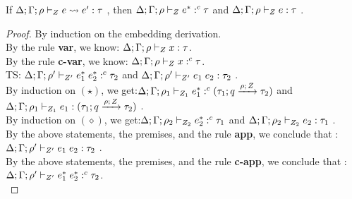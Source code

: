 \begin{thm}
If $  \Delta;  \Gamma; \rho \vdash_{ Z}  e \rightsquigarrow e'   : 
     \tau $ , then $  \Delta; \Gamma; \rho \vdash_{ Z} { e^*} :^c  \tau   $ and $   \Delta; \Gamma; \rho \vdash_{Z} e: \tau$ .
\end{thm}
\begin{proof}
By induction on the embedding derivation.\\
    By the rule \textbf{var}, we know: $   \Delta; \Gamma; \rho \vdash_{Z} x : \tau $.\\
     By the rule \textbf{c-var}, we know: $   \Delta; \Gamma; \rho \vdash_{ Z} { x} :^c  \tau   $.\\
    
    TS: $  \Delta; \Gamma; \rho' \vdash_{ Z'} { e_1^* \; e_2^*} :^c  \tau_2   $ and $   \Delta; \Gamma; \rho' \vdash_{Z'} e_1 \; e_2: \tau_2$ .\\
    By induction on $(\star)$, we get:$  \Delta; \Gamma; \rho_1 \vdash_{ Z_1} { e_1^*} :^c  (\tau_1; q \xrightarrow{\rho; \, Z} \tau_2)   $ and $   \Delta; \Gamma; \rho_1 \vdash_{Z_1} e_1: (\tau_1; q \xrightarrow{\rho; \, Z} \tau_2)$ .\\
    By induction on $(\diamond)$, we get:$  \Delta; \Gamma; \rho_2 \vdash_{ Z_2} { e_2^*} :^c  \tau_1   $ and $   \Delta; \Gamma; \rho_2 \vdash_{Z_2} e_2: \tau_1$ .\\
    By the above statements, the premises, and the rule \textbf{app}, we conclude that :  $   \Delta; \Gamma; \rho' \vdash_{Z'} e_1 \; e_2: \tau_2$ . \\
     By the above statements, the premises, and the rule \textbf{c-app}, we conclude that :  $  \Delta; \Gamma; \rho' \vdash_{ Z'} { e_1^* \; e_2^*} :^c  \tau_2   $. \\
     

\end{proof}
